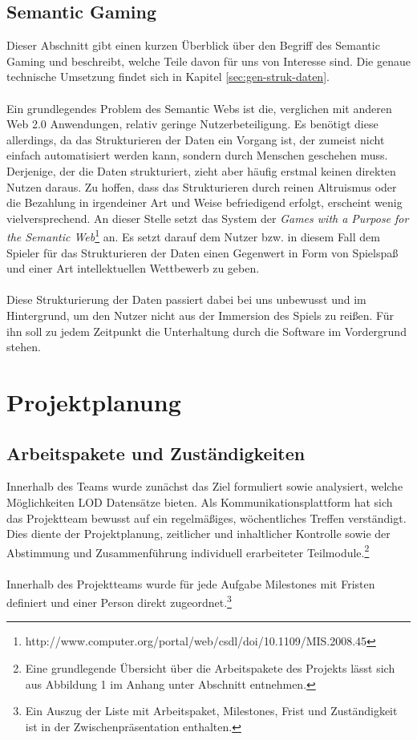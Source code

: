 \documentclass[a4paper, 11pt]{article}
\begin{document}
\subsection{Semantic Gaming}
Dieser Abschnitt gibt einen kurzen Überblick über den Begriff des Semantic Gaming und beschreibt, welche Teile davon für uns von Interesse sind. Die genaue technische Umsetzung findet sich in Kapitel \ref{sec:gen-struk-daten}.\\\\
Ein grundlegendes Problem des Semantic Webs ist die, verglichen mit anderen Web 2.0 Anwendungen, relativ geringe Nutzerbeteiligung.  Es benötigt diese allerdings, da das Strukturieren der Daten ein Vorgang ist, der zumeist nicht einfach automatisiert werden kann, sondern durch Menschen geschehen muss. Derjenige, der die Daten strukturiert, zieht aber häufig erstmal keinen direkten Nutzen daraus. Zu hoffen, dass das Strukturieren durch reinen Altruismus oder die Bezahlung in irgendeiner Art und Weise befriedigend erfolgt, erscheint wenig vielversprechend. An dieser Stelle setzt das System der \textit{Games with a Purpose for the Semantic Web}\footnote{http://www.computer.org/portal/web/csdl/doi/10.1109/MIS.2008.45} an. Es setzt darauf dem Nutzer bzw. in diesem Fall dem Spieler für das Strukturieren der Daten einen Gegenwert in Form von Spielspaß und einer Art intellektuellen Wettbewerb zu geben.\\\\
Diese Strukturierung der Daten passiert dabei bei uns unbewusst und im Hintergrund, um den Nutzer nicht aus der Immersion des Spiels zu reißen. Für ihn soll zu jedem Zeitpunkt die Unterhaltung durch die Software im Vordergrund stehen. 
\newpage
\section{Projektplanung}
\subsection{Arbeitspakete und Zuständigkeiten}
Innerhalb des Teams wurde zunächst das Ziel formuliert sowie analysiert, welche Möglichkeiten LOD Datensätze bieten. Als Kommunikationsplattform hat sich das Projektteam bewusst auf ein regelmäßiges, wöchentliches Treffen verständigt. Dies diente der Projektplanung, zeitlicher und inhaltlicher Kontrolle sowie der Abstimmung und Zusammenführung individuell erarbeiteter Teilmodule.\footnote{Eine grundlegende Übersicht über die Arbeitspakete des Projekts lässt sich aus Abbildung 1 im Anhang unter Abschnitt \pageref{pic:Pakete} entnehmen.}\\\\
Innerhalb des Projektteams wurde für jede Aufgabe Milestones mit Fristen definiert und einer Person direkt zugeordnet.\footnote{Ein Auszug der Liste mit Arbeitspaket, Milestones, Frist und Zuständigkeit ist in der Zwischenpräsentation enthalten.}
\end{document}

